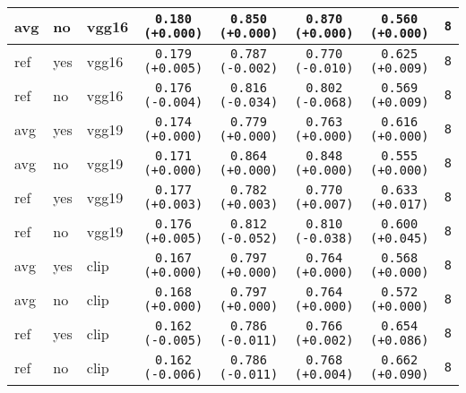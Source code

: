 \begin{tabular}{|l|l|l|c|c|c|c|c|}
\rowcolor{verylightgray}avg & no & vgg16 & \texttt{0.180 {\color{black}(+0.000)}} & \texttt{0.850 {\color{black}(+0.000)}} & \texttt{0.870 {\color{black}(+0.000)}} & \texttt{0.560 {\color{black}(+0.000)}} & \texttt{8} \\
\hline
ref & yes & vgg16 & \texttt{0.179 {\color{green}(+0.005)}} & \texttt{0.787 {\color{green}(-0.002)}} & \texttt{0.770 {\color{green}(-0.010)}} & \texttt{0.625 {\color{green}(+0.009)}} & \texttt{8} \\
ref & no & vgg16 & \texttt{0.176 {\color{red}(-0.004)}} & \texttt{0.816 {\color{green}(-0.034)}} & \texttt{0.802 {\color{green}(-0.068)}} & \texttt{0.569 {\color{green}(+0.009)}} & \texttt{8} \\
\hline
\rowcolor{verylightgray}avg & yes & vgg19 & \texttt{0.174 {\color{black}(+0.000)}} & \texttt{0.779 {\color{black}(+0.000)}} & \texttt{0.763 {\color{black}(+0.000)}} & \texttt{0.616 {\color{black}(+0.000)}} & \texttt{8} \\
\rowcolor{verylightgray}avg & no & vgg19 & \texttt{0.171 {\color{black}(+0.000)}} & \texttt{0.864 {\color{black}(+0.000)}} & \texttt{0.848 {\color{black}(+0.000)}} & \texttt{0.555 {\color{black}(+0.000)}} & \texttt{8} \\
\hline
ref & yes & vgg19 & \texttt{0.177 {\color{green}(+0.003)}} & \texttt{0.782 {\color{red}(+0.003)}} & \texttt{0.770 {\color{red}(+0.007)}} & \texttt{0.633 {\color{green}(+0.017)}} & \texttt{8} \\
ref & no & vgg19 & \texttt{0.176 {\color{green}(+0.005)}} & \texttt{0.812 {\color{green}(-0.052)}} & \texttt{0.810 {\color{green}(-0.038)}} & \texttt{0.600 {\color{green}(+0.045)}} & \texttt{8} \\
\hline
\rowcolor{verylightgray}avg & yes & clip & \texttt{0.167 {\color{black}(+0.000)}} & \texttt{0.797 {\color{black}(+0.000)}} & \texttt{0.764 {\color{black}(+0.000)}} & \texttt{0.568 {\color{black}(+0.000)}} & \texttt{8} \\
\rowcolor{verylightgray}avg & no & clip & \texttt{0.168 {\color{black}(+0.000)}} & \texttt{0.797 {\color{black}(+0.000)}} & \texttt{0.764 {\color{black}(+0.000)}} & \texttt{0.572 {\color{black}(+0.000)}} & \texttt{8} \\
\hline
ref & yes & clip & \texttt{0.162 {\color{red}(-0.005)}} & \texttt{0.786 {\color{green}(-0.011)}} & \texttt{0.766 {\color{red}(+0.002)}} & \texttt{0.654 {\color{green}(+0.086)}} & \texttt{8} \\
ref & no & clip & \texttt{0.162 {\color{red}(-0.006)}} & \texttt{0.786 {\color{green}(-0.011)}} & \texttt{0.768 {\color{red}(+0.004)}} & \texttt{0.662 {\color{green}(+0.090)}} & \texttt{8} \\
\hline
\end{tabular}
